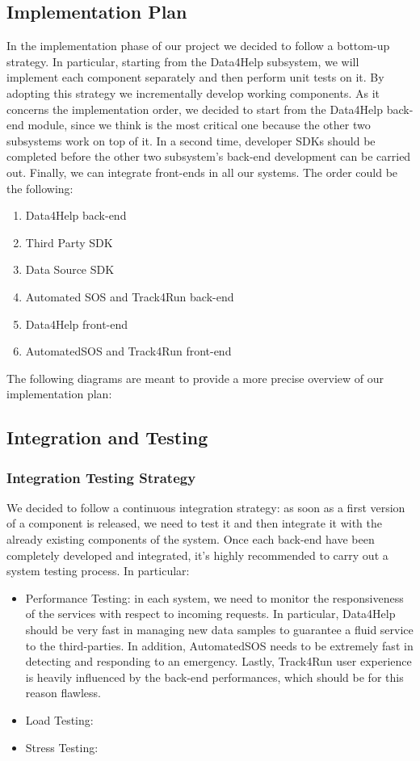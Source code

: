 \subsection{Implementation Plan}
In the implementation phase of our project we decided to follow a bottom-up strategy. In particular, starting from the Data4Help subsystem, we will implement each component separately and then perform unit tests on it. By adopting this strategy we incrementally develop working components.
As it concerns the implementation order, we decided to start from the Data4Help back-end module, since we think is the most critical one because the other two subsystems work on top of it.
In a second time, developer SDKs should be completed before the other two subsystem's back-end development can be carried out.
Finally, we can integrate front-ends in all our systems.
The order could be the following:

\begin{enumerate}
    \item Data4Help back-end
    \item Third Party SDK
    \item Data Source SDK
    \item Automated SOS and Track4Run back-end
    \item Data4Help front-end
    \item AutomatedSOS and Track4Run front-end
\end{enumerate}

The following diagrams are meant to provide a more precise overview of our implementation plan:

\subsection{Integration and Testing}


\subsubsection{Integration Testing Strategy}
We decided to follow a continuous integration strategy: as soon as a first version of a component is released, we need to test it and then integrate it with the already existing components of the system.
Once each back-end have been completely developed and integrated, it's highly recommended to carry out a system testing process. In particular:

\begin{itemize}
    \item Performance Testing: in each system, we need to monitor the responsiveness of the services with respect to incoming requests. In particular, Data4Help should be very fast in managing new data samples to guarantee a fluid service to the third-parties. In addition, AutomatedSOS needs to be extremely fast in detecting and responding to an emergency. Lastly, Track4Run user experience is heavily influenced by the back-end performances, which should be for this reason flawless.
    \item Load Testing: 
    \item Stress Testing:
\end{itemize}

